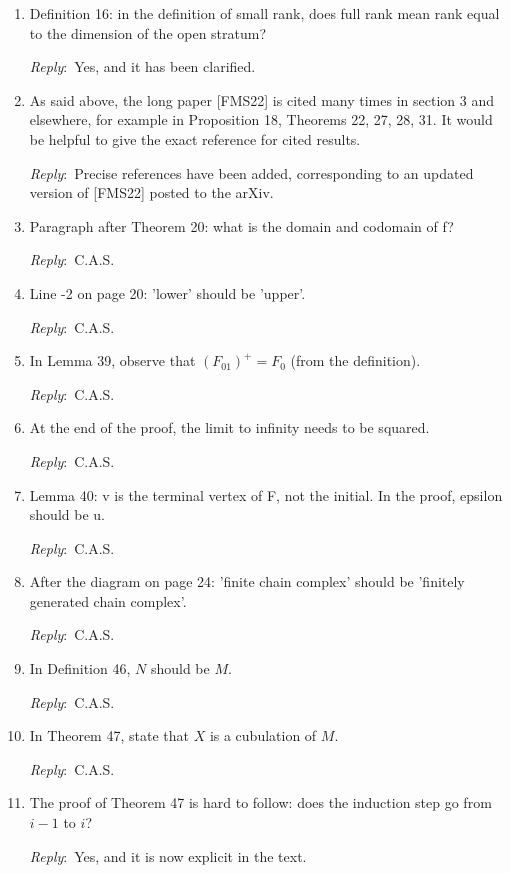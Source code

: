 \documentclass{amsart}
\newcommand{\ar}{\medskip\noindent\textit{Reply}:\ }
\newcommand{\cas}{\ar C.A.S.}
\begin{document}
\begin{enumerate}
	\ar Clarified

	\item Definition 16: in the definition of small rank, does full rank mean rank equal to the dimension of the open stratum?

	\ar Yes, and it has been clarified.

	\item As said above, the long paper [FMS22] is cited many times in section 3 and elsewhere, for example in Proposition 18, Theorems 22, 27, 28, 31. It would be helpful to give the exact reference for cited results.

	\ar Precise references have been added, corresponding to an updated version of [FMS22] posted to the arXiv.

	\item Paragraph after Theorem 20: what is the domain and codomain of f?

	\cas

	\item Line -2 on page 20: 'lower' should be 'upper'.

	\cas

	\item In Lemma 39, observe that $(F_{01})^+ = F_0$ (from the definition).

	\cas

	\item At the end of the proof, the limit to infinity needs to be squared.

	\cas

	\item Lemma 40: v is the terminal vertex of F, not the initial. In the proof, epsilon should be u.

	\cas

	\item After the diagram on page 24: 'finite chain complex' should be 'finitely generated chain complex'.

	\cas

	\item In Definition 46, $N$ should be $M$.

	\cas

	\item In Theorem 47, state that $X$ is a cubulation of $M$.

	\cas

	\item The proof of Theorem 47 is hard to follow: does the induction step go from $i-1$ to $i$?

	\ar Yes, and it is now explicit in the text.


\end{enumerate}
\end{document}
